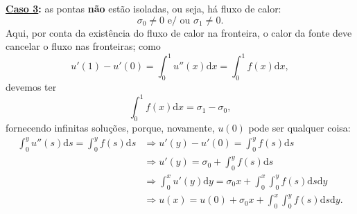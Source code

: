 \documentclass[../differential_methods.tex]{subfiles}
\begin{document}
\textbf{\underline{Caso 3}:} as pontas \textbf{não} estão isoladas, ou seja, há fluxo de calor:
\[
	\sigma_{0}\neq 0 \text{ e/ ou } \sigma_{1}\neq 0.
\]
Aqui, por conta da existência do fluxo de calor na fronteira, o calor da fonte deve cancelar o fluxo nas fronteiras; como
\[
	u'(1)-u'(0)=\int_{0}^{1}u''(x) \mathrm{d}x = \int_{0}^{1}f(x) \mathrm{d}x,
\]
devemos ter
\[
	\int_{0}^{1}f(x) \mathrm{d}x =\sigma_1-\sigma_{0},
\]
fornecendo infinitas soluções, porque, novamente, \(u(0)\) pode ser qualquer coisa:
\begin{align*}
	\int_{0}^{y}u''(s) \mathrm{d}s = \int_{0}^{y}f(s) \mathrm{d}s & \Rightarrow u'(y)-u'(0)=\int_{0}^{y}f(s) \mathrm{d}s                                                         \\
	                                                              & \Rightarrow u'(y)=\sigma_{0}+\int_{0}^{y}f(s) \mathrm{d}s                                                    \\
	                                                              & \Rightarrow \int_{0}^{x}u'(y) \mathrm{d}y = \sigma_{0}x+\int_{0}^{x}\int_{0}^{y}f(s) \mathrm{d}s \mathrm{d}y \\
	                                                              & \Rightarrow u(x)=u(0)+\sigma_{0}x+\int_{0}^{x}\int_{0}^{y}f(s) \mathrm{d}s \mathrm{d}y.
\end{align*}
\end{document}
